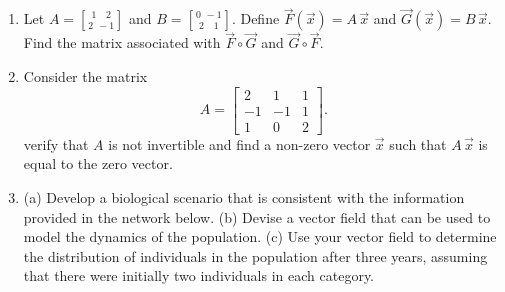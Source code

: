 \documentclass[11pt]{article}
\begin{document}
\begin{enumerate}
\begin{enumerate}
        \[
          \text{(a)}
          \quad
          \begin{bmatrix}
            -1 & 0 & 2 \\ 
            1 & 1 & 1 \\ 
            2 & -1 & 1
          \end{bmatrix}
          \quad 
          \text{(b)}
          \quad
          \begin{bmatrix}
            1 & 0 & 1\\ 
            -1& 2 & 1\\
            0 & 2 & 2
          \end{bmatrix}
          \quad
          \text{(c)}
          \quad
          \begin{bmatrix}
            0 & -2 & 1 \\
            1 & 0 & 1 \\
            0 & 0 & -1
          \end{bmatrix}
        \]
      \item  Let $A = {1 \quad 2\brack 2\ \, -1}$ and $B={0\, \ -1 \brack 2 \quad 1}$. Define $\vec{F}(\vec{x}) = A\, \vec{x}$ and $\vec{G}(\vec{x}) = B\, \vec{x}$. Find the matrix associated with $\vec{F} \circ \vec{G}$ and $\vec{G} \circ \vec{F}$.
      \item Consider the matrix
        \[
          A =
          \begin{bmatrix}
            2 & 1 & 1 \\ -1 & -1 & 1 \\ 1 & 0 & 2
          \end{bmatrix}.
        \]
        verify that $A$ is not invertible and find a non-zero vector $\vec{x}$ such that $A\, \vec{x}$ is equal to the zero vector.
      \item (a) Develop a biological scenario that is consistent with the information provided in the network below. (b) Devise a vector field that can be used to model the dynamics of the population. (c) Use your vector field to determine the distribution of individuals in the population after three years, assuming that there were initially two individuals in each category. 
        \begin{center}
\end{center}
\end{enumerate}
\end{enumerate}
\end{document}
